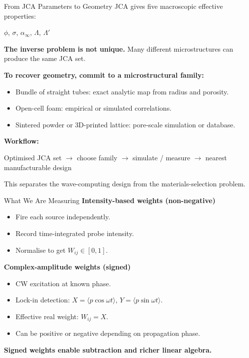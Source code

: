 \documentclass[aspectratio=169,11pt]{beamer}
\begin{document}
\begin{frame}{From JCA Parameters to Geometry}
  \small
  JCA gives five macroscopic effective properties:
  \begin{center}
    $\phi$, $\sigma$, $\alpha_\infty$, $\Lambda$, $\Lambda'$
  \end{center}

  \vspace{0.2cm}
  \textbf{The inverse problem is not unique.}
  Many different microstructures can produce the same JCA set.

  \vspace{0.3cm}
  \textbf{To recover geometry, commit to a microstructural family:}
  \begin{itemize}
    \item Bundle of straight tubes: exact analytic map from radius and porosity.
    \item Open-cell foam: empirical or simulated correlations.
    \item Sintered powder or 3D-printed lattice: pore-scale simulation or database.
  \end{itemize}

  \vspace{0.3cm}
  \textbf{Workflow:}
  \begin{center}
    \small
    Optimised JCA set $\to$ choose family $\to$ simulate / measure $\to$ nearest manufacturable design
  \end{center}

  \vspace{0.2cm}
  \textcolor{gdpSlate}{\small This separates the wave-computing design from the materials-selection problem.}
\end{frame}

\begin{frame}{What We Are Measuring}
  \textbf{Intensity-based weights (non-negative)}
  \begin{itemize}
    \item Fire each source independently.
    \item Record time-integrated probe intensity.
    \item Normalise to get $W_{ij} \in [0,1]$.
  \end{itemize}

  \vspace{0.4cm}
  \textbf{Complex-amplitude weights (signed)}
  \begin{itemize}
    \item CW excitation at known phase.
    \item Lock-in detection: $X = \langle p \cos \omega t \rangle$, $Y = \langle p \sin \omega t \rangle$.
    \item Effective real weight: $W_{ij} = X$.
    \item Can be positive or negative depending on propagation phase.
  \end{itemize}

  \vspace{0.3cm}
  \textcolor{gdpDarkBlue}{\textbf{Signed weights enable subtraction and richer linear algebra.}}
\end{frame}
\end{document}

